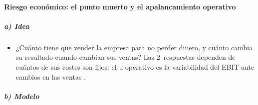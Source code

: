 \documentclass[11pt]{article}
\begin{document}
\paragraph{Riesgo económico: el punto muerto y el apalancamiento operativo}\label{sec:riesgo-economico}

\subparagraph{a) Idea}

\begin{itemize}
\item ¿Cuánto tiene que vender la empresa para no perder dinero, y cuánto cambia su resultado cuando cambian sus ventas? Las 2~respuestas dependen de cuántos de sus costes son fijos: el  u operativo es la variabilidad del EBIT ante cambios en las ventas .
\end{itemize}

\subparagraph{b) Modelo}
\end{document}
